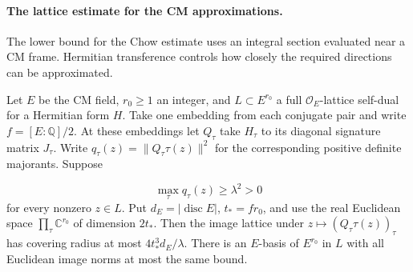 \paragraph{The lattice estimate for the CM approximations.}

The lower bound for the Chow estimate uses an integral section evaluated near a CM frame. Hermitian transference controls how closely the required directions can be approximated.

\begin{lemma}
\label{lem:cm-lattice-transference}
Let \(E\) be the CM field, \(r_0\ge1\) an integer, and \(L\subset E^{r_0}\) a full \(\mathcal O_E\)-lattice
self-dual for a Hermitian form \(H\). Take one embedding from
each conjugate pair and write \(f=[E:\mathbb Q]/2\).
At these embeddings let \(Q_\tau\) take \(H_\tau\) to its
diagonal signature matrix \(J_\tau\). Write
\(q_\tau(z)=\|Q_\tau\tau(z)\|^2\) for the corresponding
positive definite majorants. Suppose

\[
  \max_\tau q_\tau(z)\ge\lambda^2>0
\]
 for every nonzero
\(z\in L\). Put \(d_E=|\operatorname{disc}E|\),
\(t_*=fr_0\), and use the real Euclidean space
\(\prod_\tau\mathbb C^{r_0}\) of dimension \(2t_*\).
Then the image lattice under \(z\mapsto(Q_\tau\tau(z))_\tau\)
has covering radius at most \(4t_*^3d_E/\lambda\). There is
an \(E\)-basis of \(E^{r_0}\) in \(L\) with all Euclidean
image norms at most the same bound.

\end{lemma}

